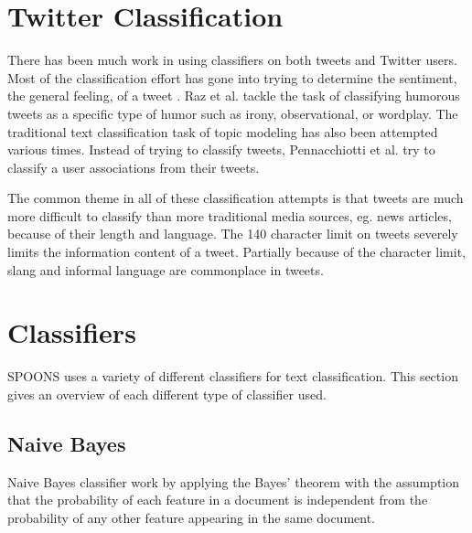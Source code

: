 \documentclass[12pt]{ucthesis}
\begin{document}

\chapter{Twitter Classification}
\label{background-classification}
There has been much work in using classifiers on both tweets and Twitter users.
Most of the classification effort has gone into trying to determine the sentiment,
the general feeling, of a tweet \cite{Jiang}\cite{Mukherjee}\cite{Saif}\cite{Wang}.
Raz et al. tackle the task of classifying humorous tweets as a specific type of humor
such as irony, observational, or wordplay\cite{Raz}.
The traditional text classification task of topic modeling has also been attempted various times\cite{hong}\cite{Zhao}.
Instead of trying to classify tweets, Pennacchiotti et al. try to classify a user associations from
their tweets\cite{Pennacchiotti}.

The common theme in all of these classification attempts is that tweets are much more difficult to
classify than more traditional media sources, eg. news articles, because of their length and language.
The 140 character limit on tweets severely limits the information content of a tweet.
Partially because of the character limit, slang and informal language are commonplace in tweets.

\chapter{Classifiers}
\label{background-classification-classifiers}
SPOONS uses a variety of different classifiers for text classification.
This section gives an overview of each different type of classifier used.

\section{Naive Bayes}
\label{background-classification-classifiers-naive-bayes}
Naive Bayes classifier work by applying the Bayes' theorem with the assumption that
the probability of each feature in a document is independent from the probability of
any other feature appearing in the same document.\cite{Kibriya}\cite{Frank}
\end{document}
